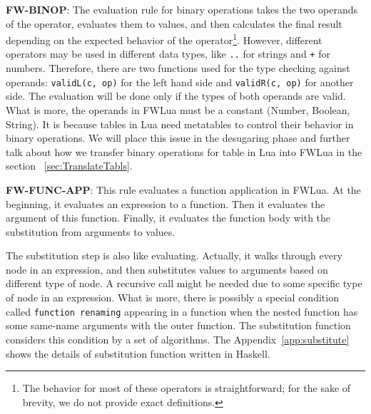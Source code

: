 {\bf FW-BINOP}: The evaluation rule for binary operations takes the two operands of the operator, evaluates them to values, and then calculates the final result depending on the expected behavior of the operator\footnote{
  The behavior for most of these operators is straightforward;
  for the sake of brevity, we do not provide exact definitions.
}.
However, different operators may be used in different data types, like {\tt ..} for strings and {\tt +} for numbers. Therefore, there are two functions used for the type checking against operands: {\tt validL(c, op)} for the left hand side and {\tt validR(c, op)} for another side. The evaluation will be done only if the types of both operands are valid.
What is more, the operands in FWLua must be a constant (Number, Boolean, String). It is because tables in Lua need metatables to control their behavior in binary operations. We will place this issue in the desugaring phase and further talk about how we transfer binary operations for table in Lua into FWLua in the section ~\ref{sec:TranslateTabls}.

{\bf FW-FUNC-APP}: This rule evaluates a function application in FWLua. At the beginning, it evaluates an expression to a function. Then it evaluates the argument of this function.  Finally, it evaluates the function body with the substitution from arguments to values. 

The substitution step is also like evaluating. Actually, it walks through every node in an expression, and then substitutes values to arguments based on different type of node. A recursive call might be needed due to some specific type of node in an expression.
What is more, there is possibly a special condition called {\tt function renaming} appearing in a function when the nested function has some same-name arguments with the outer function. The substitution function considers this condition by a set of algorithms. The Appendix~\ref{app:substitute} shows the details of substitution function written in Haskell.



